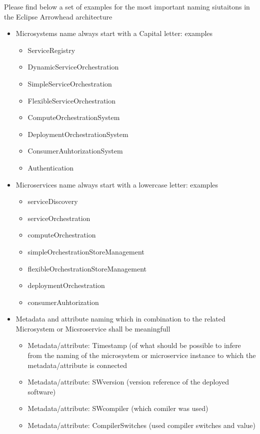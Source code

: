 \documentclass[a4paper]{arrowhead}
\begin{document}
Please find below a set of examples for the most important naming
siutaitons in the Eclipse Arrowhead architecture
\begin{itemize}
\item Microsystems name always start with a Capital letter: examples
  \begin{itemize}
  \item ServiceRegistry
  \item DynamicServiceOrchestration
  \item SimpleServiceOrchestration
  \item FlexibleServiceOrchestration

  \item ComputeOrchestrationSystem
  \item DeploymentOrchestrationSystem
  \item ConsumerAuhtorizationSystem
  \item Authentication
  \end{itemize}
  
\item Microservices name always start with a lowercase letter: examples 
  \begin{itemize}
  \item serviceDiscovery
  \item serviceOrchestration
  \item computeOrchestration
  \item simpleOrchestrationStoreManagement
  \item flexibleOrchestrationStoreManagement
  \item deploymentOrchestration
  \item consumerAuhtorization
  \end{itemize}

  

\item Metadata and attribute naming which in combination to the
  related Microsystem or Micsroservice shall be meaningfull
  \begin{itemize}
  \item Metadata/attribute: Timestamp (of what should be possible to infere from
    the naming of the microsystem or microservice instance to which the
    metadata/attribute is connected
  \item Metadata/attribute: SWversion (version reference of the
    deployed software)
  \item Metadata/attribute: SWcompiler (which comiler was used)
  \item Metadata/attribute: CompilerSwitches (used compiler switches
    and value) 
  \end{itemize}


\end{itemize}
\end{document}
